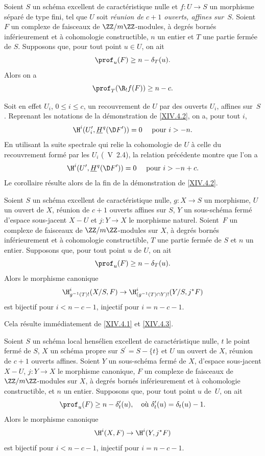 \begin{corollaire} \label{XIV.4.3}
Soient $S$ un sch\'ema excellent de caract\'eristique nulle et $f\colon U\to S$ un morphisme s\'epar\'e de type fini, tel que $U$ soit \emph{réunion de $c+1$ ouverts, affines sur~$S$}. Soient $F$ un complexe de faisceaux de $\ZZ/m\ZZ$-modules, \`a degr\'es born\'es inf\'erieurement et \`a cohomologie constructible, $n$ un entier et $T$ une partie ferm\'ee de $S$. Supposons que, pour tout point $u\in U$, on ait
$$
\prof_{u}(F)\geq n-\delta_{T}(u).
$$
Alors on a
$$
\prof_{T}(\R_{!}f(F))\geq n-c.
$$
\end{corollaire}

Soit en effet $U_{i}$, $0\leq i\leq c$, un recouvrement de $U$ par des ouverts $U_{i}$, affines sur~$S$. Reprenant les notations de la d\'emonstration de \ref{XIV.4.2}, on a, pour tout $i$,
$$
\H^{i}(U_{i}^{\prime}, \underline{H}^{q}(\D F^{\prime}))=0\quad\textrm{ pour }i>-n.
$$
En utilisant la suite spectrale qui relie la cohomologie de $U$ \`a celle du recouvrement form\'e par les $U_{i}$ (~V~2.4), la relation pr\'ec\'edente montre que l'on a
$$
\H^{i}(U^{\prime}, \underline{H}^{q}(\D F^{\prime}))=0\quad\textrm{ pour }i>-n+c.
$$
Le corollaire r\'esulte alors de la fin de la d\'emonstration de \ref{XIV.4.2}.

\begin{corollaire} \label{XIV.4.4}
Soient $S$ un sch\'ema excellent de caract\'eristique nulle, $g\colon X\to S$ un morphisme, $U$ un ouvert de $X$, r\'eunion de $c+1$ ouverts affines sur $S$, $Y$ un sous-sch\'ema ferm\'e d'espace sous-jacent $X-U$ et $j\colon Y\to X$ le morphisme naturel. Soient~$F$ un complexe de faisceaux de $\ZZ/m\ZZ$-modules sur $X$, \`a degr\'es born\'es inf\'erieurement et \`a cohomologie constructible, $T$ une partie ferm\'ee de $S$ et $n$ un entier. Supposons que, pour tout point $u$ de $U$, on ait
$$
\prof_{u}(F)\geq n-\delta_{T}(u).
$$
Alors le morphisme canonique
$$
\H_{g^{-1}(T)!}^{i}(X/S, F)\to\H_{(g^{-1}(T)\cap Y)!}^{i}(Y/S, j^{\ast}F)$$
est bijectif pour $i<n-c-1$, injectif pour $i=n-c-1$.
\end{corollaire}

Cela r\'esulte imm\'ediatement de \ref{XIV.4.1} et \ref{XIV.4.3}.

\begin{corollaire} \label{XIV.4.5}
Soient $S$ un sch\'ema local hens\'elien excellent de caract\'eristique nulle, $t$ le point ferm\'e de $S$, $X$ un sch\'ema propre sur $S^{\prime}=S-\{ t\}$ et $U$ un ouvert de $X$, r\'eunion de $c+1$ ouverts affines. Soient $Y$ un sous-sch\'ema ferm\'e de $X$, d'espace sous-jacent $X-U$, $j\colon Y\to X$ le morphisme canonique, $F$ un complexe de faisceaux de $\ZZ/m\ZZ$-modules sur $X$, \`a degr\'es born\'es inf\'erieurement et \`a cohomologie constructible, et $n$ un entier. Supposons que, pour tout point $u$ de~$U$, on ait
$$
\prof_{u}(F)\geq n-\delta_{t}^{\prime}(u), \quad\text{où } \delta_{t}^{\prime}(u)=\delta_{t}(u)-1.
$$
Alors le morphisme canonique
$$
\H^{i}(X, F)\to\H^{i}(Y, j^{\ast}F)$$
est bijectif pour $i<n-c-1$, injectif pour $i=n-c-1$.
\end{corollaire}

